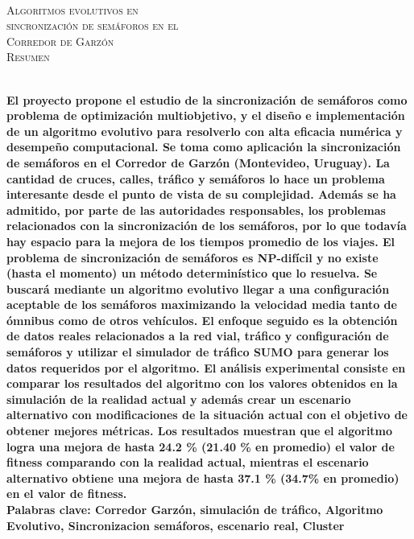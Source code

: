 {
\thispagestyle{empty}
~\\[0.2cm]
\begin{center}
    \textsc{\huge Algoritmos evolutivos en  } \\[0.2cm] 
    \textsc{\huge sincronización de semáforos en el  } \\[0.2cm]         
    \textsc{\huge Corredor de Garzón} \\[1cm]
    \textsc{\Large Resumen}
\end{center}
~\\[0.2cm]
\textbf{\large 
El proyecto propone el estudio de la sincronización de semáforos como problema de optimización multiobjetivo, y el diseño e implementación de un algoritmo evolutivo para resolverlo con alta eficacia numérica y desempeño computacional. \newline \newline
Se toma como aplicación la sincronización de semáforos en el Corredor de Garzón  (Montevideo, Uruguay). La cantidad de cruces, calles, tráfico y semáforos lo hace un problema interesante desde el punto de vista de su complejidad. Además se ha admitido, por parte de las autoridades responsables, los problemas relacionados con la sincronización de los semáforos, por lo que todavía hay espacio para la mejora de los tiempos promedio de los viajes.  \newline \newline
El problema de sincronización de semáforos es NP-difícil y no existe (hasta el momento) un método determinístico que lo resuelva. Se buscará mediante un algoritmo evolutivo llegar a una configuración aceptable de los semáforos maximizando la velocidad media tanto de ómnibus como de otros vehículos.
El enfoque seguido es la obtención de datos reales relacionados a la red vial, tráfico y configuración de semáforos y utilizar el simulador de tráfico SUMO para generar los datos requeridos por el algoritmo.
\newline \newline
El análisis experimental consiste en comparar los resultados del algoritmo con los valores obtenidos en la simulación de la realidad actual y además crear un escenario alternativo con modificaciones de la situación actual con el objetivo de obtener mejores métricas. Los resultados muestran que el algoritmo logra una mejora de hasta  24.2 \% (21.40 \% en promedio) el valor de fitness comparando con la realidad actual, mientras el escenario alternativo obtiene una mejora de hasta 37.1 \% (34.7\% en promedio) en el valor de fitness.
 } 	
	~\\[1.0cm]
    \textbf{\large Palabras clave: Corredor Garzón, simulación de tráfico,  Algoritmo Evolutivo, Sincronizacion semáforos, escenario real, Cluster}

}
\cleardoublepage
